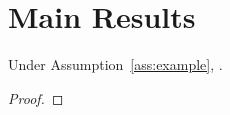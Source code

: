 \section{Main Results}
\label{sec:theorems}

\begin{theorem}
\label{thm:main}
Under Assumption~\ref{ass:example}, .
\end{theorem}

\begin{proof}
\end{proof}

%
